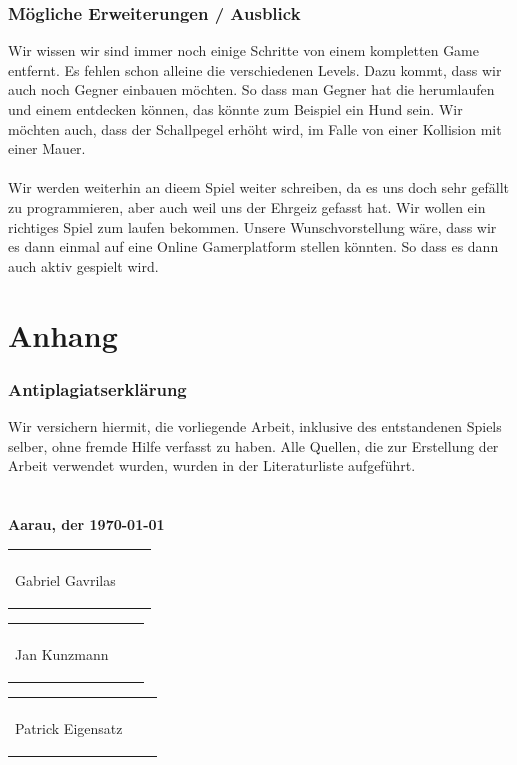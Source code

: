 \documentclass[12pt,a4paper]{scrartcl}
\begin{document}
\newpage
\section{Mögliche Erweiterungen / Ausblick}
Wir wissen wir sind immer noch einige Schritte von einem kompletten Game entfernt. Es fehlen schon alleine die verschiedenen Levels. Dazu kommt, dass wir auch noch Gegner einbauen möchten. So dass man Gegner hat die herumlaufen und einem entdecken können, das könnte zum Beispiel ein Hund sein. Wir möchten auch, dass der Schallpegel erhöht wird, im Falle von einer Kollision mit einer Mauer. 	
\\ 	
\\ 	
Wir werden weiterhin an dieem Spiel weiter schreiben, da es uns doch sehr gefällt zu programmieren, aber auch weil uns der Ehrgeiz gefasst hat. Wir wollen ein richtiges Spiel zum laufen bekommen. Unsere Wunschvorstellung wäre, dass wir es dann einmal auf eine Online Gamerplatform stellen könnten. So dass es dann auch aktiv gespielt wird. 


\clearpage
\part{Anhang}
\listoffigures

\clearpage

\printbibliography

\clearpage

\section*{Antiplagiatserklärung}
Wir versichern hiermit, die vorliegende Arbeit, inklusive des entstandenen Spiels
selber, ohne fremde Hilfe verfasst zu haben. Alle Quellen, die zur Erstellung
der Arbeit verwendet wurden, wurden in der Literaturliste aufgeführt.
\\\\\\
\textbf{Aarau, der \today}\\

\vspace{1 cm} 
\begin{tabular}{p{5cm}p{.5cm}l}
\dotfill \\ 
\begin{center}
Gabriel Gavrilas

\end{center}\end{tabular}%
\hfill 
\begin{tabular}{p{5cm}p{.5cm}l}
\dotfill \\ 
\begin{center}
Jan Kunzmann

\end{center}\end{tabular}%
\hfill 
\begin{tabular}{p{5cm}p{.5cm}l}
\dotfill \\ 
\begin{center}
Patrick Eigensatz
\end{center}
\end{tabular}%
  
\end{document}
